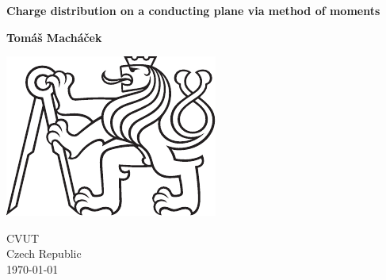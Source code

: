 \begin{titlepage}
    \begin{center}
        \textbf{\LARGE Charge distribution on a conducting plane via method of moments}

        \vspace{5em}

        \textbf{\Large Tomáš Macháček}

        \vspace{5em}

        \includegraphics[scale=0.75]{symbol_cvut_konturova_verze_cb.pdf}

        \vfill

        CVUT\\
        Czech Republic\\
        \today
    \end{center}
\end{titlepage}
